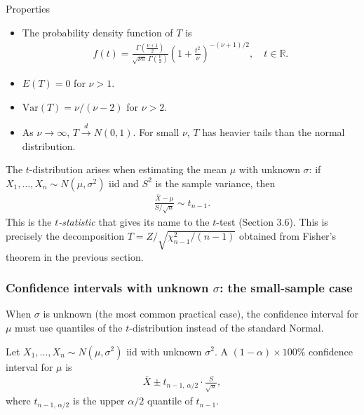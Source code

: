 {Properties}
\begin{itemize}
 \item The probability density function of $T$ is
 \begin{align}
  \label{eq:3.2.13}
  f(t) = \frac{\Gamma\!\left(\frac{\nu+1}{2}\right)}{\sqrt{\nu\pi}\,\Gamma\!\left(\frac{\nu}{2}\right)}
  \left(1 + \frac{t^2}{\nu}\right)^{-(\nu+1)/2}, \quad t \in \mathbb{R}.
 \end{align}
 \item $E(T) = 0$ for $\nu > 1$.
 \item $\text{Var}(T) = \nu/(\nu - 2)$ for $\nu > 2$.
 \item As $\nu \to \infty$, $T \xrightarrow{d} N(0,1)$. For small $\nu$, $T$ has heavier tails than the normal distribution.
\end{itemize}

\begin{observacion}
The $t$-distribution arises when estimating the mean $\mu$ with unknown $\sigma$: if $X_1, \ldots, X_n \sim N(\mu, \sigma^2)$ iid and $S^2$ is the sample variance, then
\begin{align}
 \label{eq:3.2.14}
 \frac{\bar{X} - \mu}{S/\sqrt{n}} \sim t_{n-1}.
\end{align}
This is the \emph{$t$-statistic} that gives its name to the $t$-test (Section 3.6). This is precisely the decomposition $T = Z/\sqrt{\chi^2_{n-1}/(n-1)}$ obtained from Fisher's theorem in the previous section.
\end{observacion}

\subsubsection{Confidence intervals with unknown $\sigma$: the small-sample case}

When $\sigma$ is unknown (the most common practical case), the confidence interval for $\mu$ must use quantiles of the $t$-distribution instead of the standard Normal.

\begin{teorema}
 \label{eq:5.4.1}
Let $X_1, \ldots, X_n \sim N(\mu, \sigma^2)$ iid with unknown $\sigma^2$. A $(1-\alpha)\times 100\%$ confidence interval for $\mu$ is
\begin{align}
 \bar{X} \pm t_{n-1,\,\alpha/2} \cdot \frac{S}{\sqrt{n}},
\end{align}
where $t_{n-1,\,\alpha/2}$ is the upper $\alpha/2$ quantile of $t_{n-1}$.
\end{teorema}

